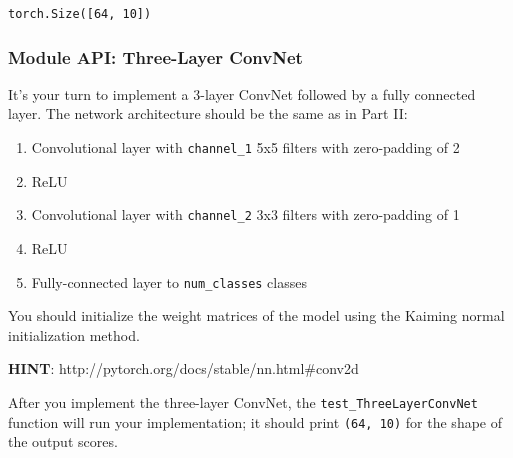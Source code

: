 \documentclass[11pt]{article}
\providecommand{\tightlist}{%
      \setlength{\itemsep}{0pt}\setlength{\parskip}{0pt}}
\begin{document}
    \begin{Verbatim}[commandchars=\\\{\}]
torch.Size([64, 10])
    \end{Verbatim}

    \hypertarget{module-api-three-layer-convnet}{%
\subsubsection{Module API: Three-Layer
ConvNet}\label{module-api-three-layer-convnet}}

It's your turn to implement a 3-layer ConvNet followed by a fully
connected layer. The network architecture should be the same as in Part
II:

\begin{enumerate}
\def\labelenumi{\arabic{enumi}.}
\tightlist
\item
  Convolutional layer with \texttt{channel\_1} 5x5 filters with
  zero-padding of 2
\item
  ReLU
\item
  Convolutional layer with \texttt{channel\_2} 3x3 filters with
  zero-padding of 1
\item
  ReLU
\item
  Fully-connected layer to \texttt{num\_classes} classes
\end{enumerate}

You should initialize the weight matrices of the model using the Kaiming
normal initialization method.

\textbf{HINT}: http://pytorch.org/docs/stable/nn.html\#conv2d

After you implement the three-layer ConvNet, the
\texttt{test\_ThreeLayerConvNet} function will run your implementation;
it should print \texttt{(64,\ 10)} for the shape of the output scores.
\end{document}
